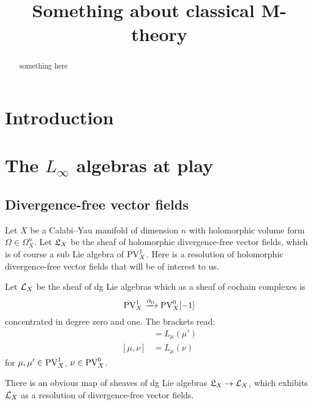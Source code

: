 \documentclass[11pt]{amsart}
\numberwithin{equation}{section}
\def\vectdiv{\fL}
\def\PV{{\rm PV}}
\def\div{\partial_\Omega}
\begin{document}
\title{Something about classical M-theory}




\begin{abstract}
something here
\end{abstract}

\maketitle
\thispagestyle{empty}
\setcounter{tocdepth}{1}

\section{Introduction}

\section{The $L_\infty$ algebras at play}

\subsection{Divergence-free vector fields}

Let $X$ be a Calabi--Yau manifold of dimension $n$ with holomorphic volume form $\Omega \in \Omega^n_X$. 
Let $\vectdiv_X$ be the sheaf of holomorphic divergence-free vector fields, which is of course a sub Lie algebra of $\PV^1_X$. 
Here is a resolution of holomorphic divergence-free vector fields that will be of interest to us.

\begin{dfn}
Let $\mathcal L_X$ be the sheaf of dg Lie algebras which as a sheaf of cochain complexes is 
\[
\PV^1_X \xto{\div} \PV^0_X [-1] 
\]
concentrated in degree zero and one. 
The brackets read:
\begin{align*}
[\mu, \mu'] & = L_\mu(\mu') \\
[\mu, \nu] & = L_\mu(\nu)
\end{align*}
for $\mu,\mu' \in \PV^1_X$, $\nu \in \PV^0_X$. 
\end{dfn}

There is an obvious map of sheaves of dg Lie algebras $\vectdiv_X \to \cL_X$, which exhibits $\mathcal L_X$ as a resolution of divergence-free vector fields. 
\end{document}
